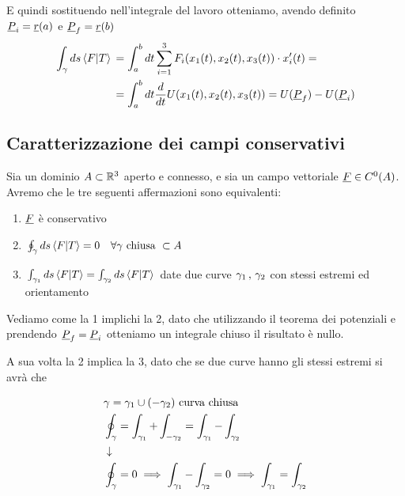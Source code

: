 E quindi sostituendo nell'integrale del lavoro otteniamo, avendo definito $\underline{P}_i = \underline{r}(a)$ e $\underline{P}_f = \underline{r}(b)$
\begin{align}
	\int_{\gamma} ds \braket{F|T} {}&= \int_{a}^{b} dt \sum_{i=1}^{3}F_i(x_1(t),x_2(t),x_3(t)) \cdot x'_i(t) = \nonumber \\ &=\int_{a}^{b} dt \frac{d }{d t}U(x_1(t) , x_2(t) , x_3(t)) = U(\underline{P}_f) - U(\underline{P}_i)
\end{align}

\newpage

\subsection{Caratterizzazione dei campi conservativi}

Sia un dominio $A\subset \mathbb{R}^3$ aperto e connesso, e sia un campo vettoriale $\underline{F} \in C^0(A)$. Avremo che le tre seguenti affermazioni sono equivalenti:
\begin{enumerate}
	\item $\underline{F}$ è conservativo
	\item $\oint_\gamma ds \braket{F|T}=0 \quad \forall \gamma \text{ chiusa } \subset A$
	\item $\int_{\gamma_1}ds \braket{F|T} = \int_{\gamma_2}ds \braket{F|T}$ date due curve $\gamma_1 \, , \, \gamma_2$ con stessi estremi ed orientamento
\end{enumerate}

Vediamo come la 1 implichi la 2, dato che utilizzando il teorema dei potenziali e prendendo $\underline{P}_f=\underline{P}_i$ otteniamo un integrale chiuso il risultato è nullo.

\bigskip

A sua volta la 2 implica la 3, dato che se due curve hanno gli stessi estremi si avrà che
\begin{figure}[!htb]
\end{figure}
\begin{align}
	{}&\gamma = \gamma_1 \cup (-\gamma_2) \text{ curva chiusa}\\
	&\oint_\gamma = \int_{\gamma_1} + \int_{-\gamma_2} = \int_{\gamma_1} - \int_{\gamma_2} \nonumber \\ &\downarrow \nonumber \\
	& \oint_\gamma =0 \implies \int_{\gamma_1} - \int_{\gamma_2} = 0 \implies \int_{\gamma_1} = \int_{\gamma_2}
\end{align}

